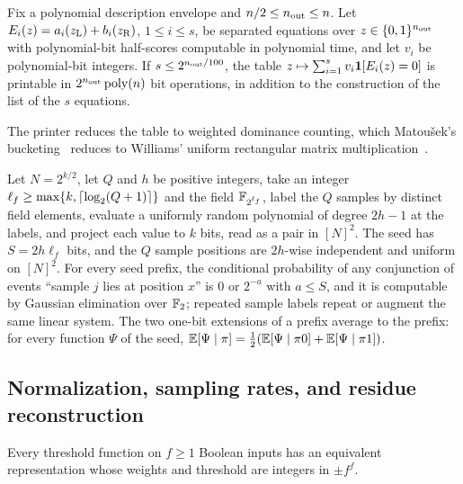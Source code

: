 \begin{imported}\label{imp:printer}
Fix a polynomial description envelope and \(n/2\le n_{\rm out}\le n\).
Let \(E_i(z)=a_i(z_{\rm L})+b_i(z_{\rm R})\), \(1\le i\le s\), be
separated equations over \(z\in\{0,1\}^{n_{\rm out}}\) with
polynomial-bit half-scores computable in polynomial time, and let
\(v_i\) be polynomial-bit integers. If \(s\le2^{n_{\rm out}/100}\),
the table \(z\mapsto\sum_{i=1}^sv_i\mathbf 1[E_i(z)=0]\) is printable in
\(2^{n_{\rm out}}\operatorname{poly}(n)\) bit operations, in addition to the
construction of the list of the \(s\) equations.
\end{imported}

The printer reduces the table to weighted dominance counting, which
Matou\v{s}ek's bucketing~\cite{Mat91} reduces to Williams' uniform
rectangular matrix multiplication~\cite[Corollary~4.4]{WilACC14}.

\begin{imported}\label{imp:seed}
Let \(N=2^{k/2}\), let \(Q\) and \(h\) be positive integers, take an
integer \(\ell_f\ge\max\{k,\lceil\log_2(Q+1)\rceil\}\) and the field
\(\mathbb F_{2^{\ell_f}}\), label the \(Q\) samples by distinct field elements,
evaluate a uniformly random polynomial of degree \(2h-1\) at the
labels, and project each value to \(k\) bits, read as a pair in
\([N]^2\). The seed has \(S=2h\ell_f\) bits, and the \(Q\) sample
positions are \(2h\)-wise independent and uniform on \([N]^2\). For
every seed prefix, the conditional probability of any conjunction of
events ``sample \(j\) lies at position \(x\)'' is \(0\) or \(2^{-a}\)
with \(a\le S\), and it is computable by Gaussian elimination over
\(\mathbb F_2\); repeated sample labels repeat or augment the same linear
system. The two one-bit extensions of a prefix average to the prefix:
for every function \(\Psi\) of the seed,
\(\mathbb E[\Psi\mid\pi]=\tfrac12(\mathbb E[\Psi\mid\pi0]+\mathbb E[\Psi\mid\pi1])\).
\end{imported}

\subsection{Normalization, sampling rates, and residue reconstruction}\label{sec:imports-nc}

\begin{imported}\label{imp:integer}
Every threshold function on \(f\ge1\) Boolean inputs has an
equivalent representation whose weights and threshold are integers in
\(\pm f^f\).
\end{imported}

